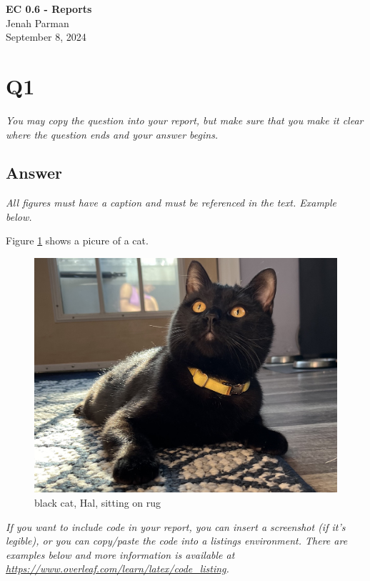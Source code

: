 \documentclass[12pt]{article}
\begin{document}
\begin{centering}
{\large\textbf{EC 0.6 - Reports}}\\ 
Jenah Parman\\
September 8, 2024\\
\end{centering}


\section*{Q1}

\emph{You may copy the question into your report, but make sure that you make it clear where the question ends and your answer begins.}

\subsection*{Answer}

\emph{All figures must have a caption and must be referenced in the text. Example below.}

Figure \ref{fig:hal} shows a picure of a cat.

\begin{figure}[h!]
    \centering
    \includegraphics[width=0.5\linewidth]{hal.jpeg}
    \caption{black cat, Hal, sitting on rug}
    \label{fig:hal}
\end{figure}

\emph{If you want to include code in your report, you can insert a screenshot (if it's legible), or you can copy/paste the code into a listings environment. There are examples below and more information is available at \url{https://www.overleaf.com/learn/latex/code_listing}.}
\end{document}
